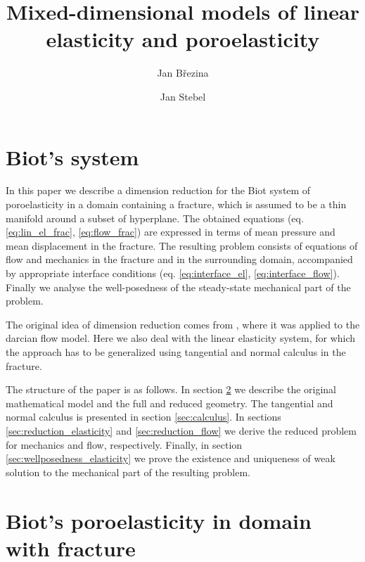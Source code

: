 \documentclass[a4paper]{article}
\begin{document}
\title{Mixed-dimensional models of linear elasticity and poroelasticity}
\author{Jan Březina}
\author{Jan Stebel}
\maketitle


\section{Biot's system}

In this paper we describe a dimension reduction for the Biot system of poroelasticity in a domain containing a fracture, which is assumed to be a thin manifold around a subset of hyperplane.
The obtained equations (eq. \eqref{eq:lin_el_frac}, \eqref{eq:flow_frac}) are expressed in terms of mean pressure and mean displacement in the fracture.
The resulting problem consists of equations of flow and mechanics in the fracture and in the surrounding domain, accompanied by appropriate interface conditions (eq. \eqref{eq:interface_el}, \eqref{eq:interface_flow}).
Finally we analyse the well-posedness of the steady-state mechanical part of the problem.

The original idea of dimension reduction comes from \cite{martin_modeling_2005}, where it was applied to the darcian flow model.
Here we also deal with the linear elasticity system, for which the approach has to be generalized using tangential and normal calculus in the fracture.

The structure of the paper is as follows.
In section \ref{sec:model} we describe the original mathematical model and the full and reduced geometry.
The tangential and normal calculus is presented in section \ref{sec:calculus}.
In sections \ref{sec:reduction_elasticity} and \ref{sec:reduction_flow} we derive the reduced problem for mechanics and flow, respectively.
Finally, in section \ref{sec:wellposedness_elasticity} we prove the existence and uniqueness of weak solution to the mechanical part of the resulting problem.


\section{Biot's poroelasticity in domain with fracture}\label{sec:model}
\end{document}
